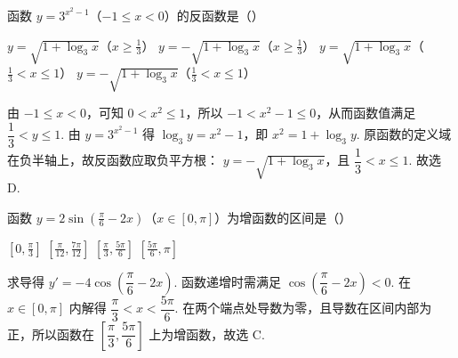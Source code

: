 \begin{problem}
函数 \( y = 3^{x^2 - 1} \)（\(-1 \leqslant x < 0\)）的反函数是（\quad）

\choices
    {\( y = \sqrt{1 + \log_{3} x} \)（\(x \geqslant \frac{1}{3}\)）}
    {\( y = -\sqrt{1 + \log_{3} x} \)（\(x \geqslant \frac{1}{3}\)）}
    {\( y = \sqrt{1 + \log_{3} x} \)（\(\frac{1}{3} < x \leqslant 1\)）}
    {\( y = -\sqrt{1 + \log_{3} x} \)（\(\frac{1}{3} < x \leqslant 1\)）}
\begin{solution}
由 \(-1\leqslant x<0\)，可知 \(0<x^2\leqslant1\)，所以
\(-1<x^2-1\leqslant0\)，从而函数值满足 \(\dfrac13<y\leqslant1\). 由
\(y=3^{x^2-1}\) 得 \(\log_3y=x^2-1\)，即 \(x^2=1+\log_3y\). 原函数的定义域在负半轴上，故反函数应取负平方根：
\(y=-\sqrt{1+\log_3x}\)，且 \(\dfrac13<x\leqslant1\). 故选 D.
\end{solution}
\end{problem}

\begin{problem}
函数 \( y = 2\sin \left(\frac{\pi}{6} - 2x\right) \)（\(x \in [0, \pi]\)）为增函数的区间是（\quad）

\choices
    {\(\left[0, \frac{\pi}{3}\right]\)}
    {\(\left[\frac{\pi}{12}, \frac{7\pi}{12}\right]\)}
    {\(\left[\frac{\pi}{3}, \frac{5\pi}{6}\right]\)}
    {\(\left[\frac{5\pi}{6}, \pi\right]\)}
\begin{solution}
求导得 \(y'=-4\cos\left(\dfrac\pi6-2x\right)\). 函数递增时需满足
\(\cos\left(\dfrac\pi6-2x\right)<0\). 在 \(x\in[0,\pi]\) 内解得
\(\dfrac\pi3<x<\dfrac{5\pi}{6}\). 在两个端点处导数为零，且导数在区间内部为正，所以函数在 \(\left[\dfrac\pi3,\dfrac{5\pi}{6}\right]\) 上为增函数，故选 C.
\end{solution}
\end{problem}

